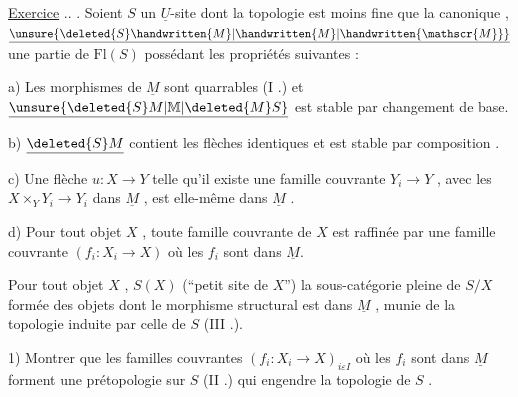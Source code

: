 \uline{Exercice} .. . Soient \(S\) un \(\underline{U}\)-site dont la topologie est moins fine que la canonique , \(\underline{\unsure{\deleted{S}\handwritten{M}|\handwritten{M}|\handwritten{\mathscr{M}}}}\) une partie de \(\mathrm{Fl}(S)\) possédant les propriétés suivantes :

 a) Les morphismes de \(\underline{M}\) sont quarrables (I .) et \(\underline{\unsure{\deleted{S}M|\mathbb{M}|\deleted{M}S}}\) est stable par changement de base.

 b) \(\underline{\deleted{S}M}\) contient les flèches identiques et est stable par composition .

 c) Une flèche \(u:X\to Y\) telle qu'il existe une famille couvrante \(Y_i\to Y\) , avec les \(X\times_Y Y_i\to Y_i\) dans \(\underline{M}\) , est elle-même dans \(\underline{M}\) .

 d) Pour tout objet \(X\) , toute famille couvrante de \(X\) est raffinée par une famille couvrante \((f_i:X_i\to X)\) où les \(f_i\) sont dans \(\underline{M}\).

Pour tout objet \(X\) ,  \(S(X)\) (``petit site de \(X\)'')%
%
\reversemarginpar{}\normalmarginpar
{} la sous-catégorie pleine de \(S/X\) formée des objets dont le morphisme structural est dans \(\underline{M}\) , munie de la topologie induite par celle de \(S\) (III .).

1) Montrer que les familles couvrantes \((f_i:X_i\to X)_{i\varepsilon I}\) où les \(f_i\) sont dans \(\underline{M}\) forment une prétopologie sur \(S\) (II .) qui engendre la topologie de \(S\) .

